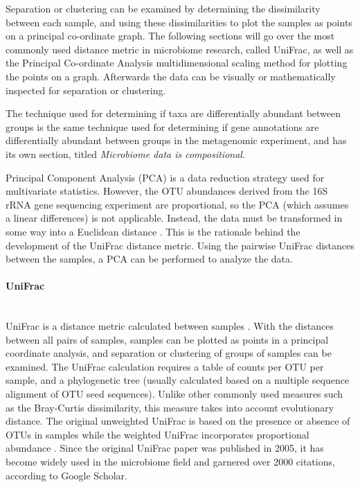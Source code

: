 Separation or clustering can be examined by determining the dissimilarity between each sample, and using these dissimilarities to plot the samples as points on a principal co-ordinate graph. The following sections will go over the most commonly used distance metric in microbiome research, called UniFrac, as well as the Principal Co-ordinate Analysis multidimensional scaling method for plotting the points on a graph. Afterwards the data can be visually or mathematically inspected for separation or clustering.

The technique used for determining if taxa are differentially abundant between groups is the same technique used for determining if gene annotations are differentially abundant between groups in the metagenomic experiment, and has its own section, titled \textit{Microbiome data is compositional}.

Principal Component Analysis (PCA) is a data reduction strategy used for multivariate statistics. However, the OTU abundances derived from the 16S rRNA gene sequencing experiment are proportional, so the PCA (which assumes a linear differences) is not applicable. Instead, the data must be transformed in some way into a Euclidean distance \cite{anderson2003canonical}. This is the rationale behind the development of the UniFrac distance metric. Using the pairwise UniFrac distances between the samples, a PCA can be performed to analyze the data.

\paragraph{UniFrac}\mbox{}\\
UniFrac is a distance metric calculated between samples \cite{lozupone2005unifrac}. With the distances between all pairs of samples, samples can be plotted as points in a principal coordinate analysis, and separation or clustering of groups of samples can be examined. The UniFrac calculation requires a table of counts per OTU per sample, and a phylogenetic tree (usually calculated based on a multiple sequence alignment of OTU seed sequences). Unlike other commonly used measures such as the Bray-Curtis dissimilarity, this measure takes into account evolutionary distance. The original unweighted UniFrac is based on the presence or absence of OTUs in samples \cite{lozupone2005unifrac} while the weighted UniFrac incorporates proportional abundance \cite{lozupone2007quantitative}. Since the original UniFrac paper was published in 2005, it has become widely used in the microbiome field and garnered over 2000 citations, according to Google Scholar.


